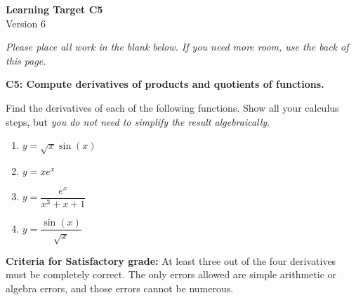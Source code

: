 \documentclass[10pt]{article}
\begin{document}
	\vspace*{0in}

		\begin{center}
			\textbf{Learning Target C5} \\
			{Version 6} \\ %
		\end{center}

\emph{Please place all work in the blank below. If you need more room, use the back of this page.}

\begin{framed}
	\textbf{C5: Compute derivatives of products and quotients of functions.}
\end{framed}

Find the derivatives of each of the following functions. Show all your calculus steps, but \emph{you do not need to simplify the result algebraically}. 

\begin{enumerate}
    \item $y = \sqrt{x} \sin(x)$
    \item $y = xe^x$
    \item $y = \dfrac{e^x}{x^3 + x + 1}$
    \item $y = \dfrac{\sin(x)}{\sqrt{x}}$
\end{enumerate}

\vfill


\begin{small}
    \begin{framed}
        	\textbf{Criteria for Satisfactory grade:} At least three out of the four derivatives must be completely correct. The only errors allowed are simple arithmetic or algebra errors, and those errors cannot be numerous.
    \end{framed}

\end{small}
\end{document}
